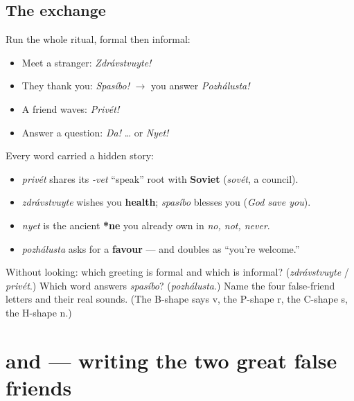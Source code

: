 \subsection*{The exchange}
Run the whole ritual, formal then informal:

\begin{itemize}
\raggedright
  \item Meet a stranger: \emph{Zdrávstvuyte!}
  \item They thank you: \emph{Spasíbo!} $\to$ you answer \emph{Pozhálusta!}
  \item A friend waves: \emph{Privét!}
  \item Answer a question: \emph{Da!} … or \emph{Nyet!}
\end{itemize}

\begin{grammarlens}[title={What you've built — the thread through the chapter}]
Every word carried a hidden story:

\begin{itemize}
\raggedright
  \item \emph{privét} shares its \emph{-vet} \textquotedblleft{}speak\textquotedblright{} root with \textbf{Soviet} (\emph{sovét}, a council).
  \item \emph{zdrávstvuyte} wishes you \textbf{health}; \emph{spasíbo} blesses you (\emph{God save you}).
  \item \emph{nyet} is the ancient \textbf{*ne} you already own in \emph{no, not, never}.
  \item \emph{pozhálusta} asks for a \textbf{favour} — and doubles as \textquotedblleft{}you're welcome.\textquotedblright{}
\end{itemize}
\end{grammarlens}

\begin{tcolorbox}[breakable,colback=teal!4,colframe=teal!35!black,title={Before you move on}]
Without looking: which greeting is formal and which is informal? (\emph{zdrávstvuyte} / \emph{privét}.) Which word answers \emph{spasíbo}? (\emph{pozhálusta}.) Name the four false-friend letters and their real sounds. (The B-shape says v, the P-shape r, the C-shape s, the H-shape n.)
\end{tcolorbox}
\section[\texorpdfstring{\ru{в}, \ru{р} (v, r)}{в, р (v, r)}]{ and  — writing the two great false friends}

